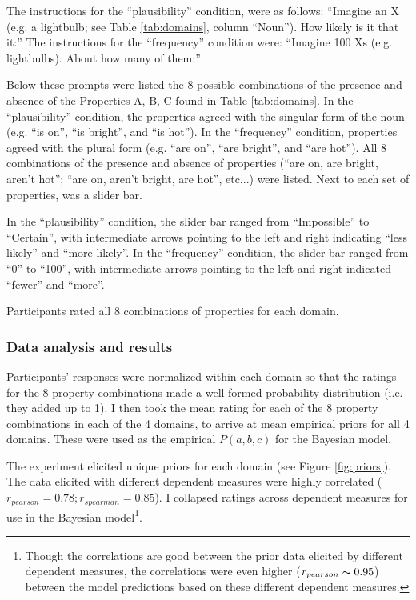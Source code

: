 \documentclass{llncs} %
\begin{document}
The instructions for the ``plausibility'' condition, were as follows: ``Imagine an X (e.g. a lightbulb; see Table \ref{tab:domains}, column ``Noun''). How likely is it that it:''  The instructions for the ``frequency'' condition were: ``Imagine 100 Xs (e.g. lightbulbs). About how many of them:''

Below these prompts were listed the 8 possible combinations of the presence and absence of the Properties A, B, C found in Table \ref{tab:domains}. In the ``plausibility'' condition, the properties agreed with the singular form of the noun (e.g. ``is on'', ``is bright'', and ``is hot''). In the ``frequency'' condition, properties agreed with the plural form (e.g. ``are on'', ``are bright'', and ``are hot''). All 8 combinations of the presence and absence of properties (``are on, are bright, aren't hot''; ``are on, aren't bright, are hot'', etc...) were listed. Next to each set of properties, was a slider bar.

In the ``plausibility'' condition, the slider bar ranged from ``Impossible'' to ``Certain'', with intermediate arrows pointing to the left and right indicating ``less likely'' and ``more likely''. In the ``frequency'' condition, the slider bar ranged from ``0'' to ``100'', with intermediate arrows pointing to the left and right indicated ``fewer'' and ``more''. 

Participants rated all 8 combinations of properties for each domain.

\subsubsection{Data analysis and results}

Participants' responses were normalized within each domain so that the ratings for the 8 property combinations made a well-formed probability distribution (i.e. they added up to 1). I then took the mean rating for each of the 8 property combinations in each of the 4 domains, to arrive at mean empirical priors for all 4 domains. These were used as the empirical $P(a,b,c)$ for the Bayesian model. 

The experiment elicited unique priors for each domain (see Figure \ref{fig:priors}). The data elicited with different dependent measures were highly correlated ($r_{pearson} = 0.78; r_{spearman} = 0.85$). I collapsed ratings across dependent measures for use in the Bayesian model\footnote{Though the correlations are good between the prior data elicited by different dependent measures, the correlations were even higher ($r_{pearson} \thicksim 0.95$) between the model predictions based on these different dependent measures.}.
\end{document}
